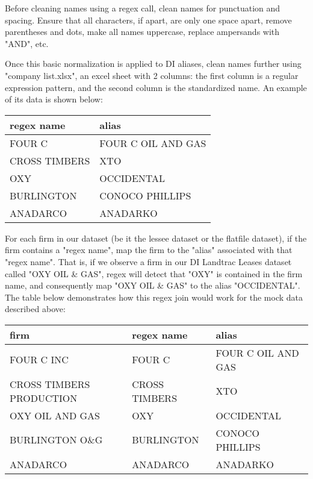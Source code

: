 \documentclass{article}
\begin{document}
Before cleaning names using a regex call, clean names for punctuation and spacing. Ensure that all characters, if apart, are only one space apart, remove parentheses and dots, make all names uppercase, replace ampersands with "AND", etc. 

Once this basic normalization is applied to DI aliases, clean names further using "company list.xlsx", an excel sheet with 2 columns: the first column is a regular expression pattern, and the second column is the standardized name. An example of its data is shown below:

\begin{center}
\begin{tabular}{| m{5cm} | m{5cm} |}
\hline
regex name & alias \\
\hline
FOUR C & FOUR C OIL AND GAS\\
CROSS TIMBERS & XTO\\
OXY & OCCIDENTAL\\
BURLINGTON & CONOCO PHILLIPS\\
ANADARCO & ANADARKO \\
\hline
\end{tabular}
\end{center}

For each firm in our dataset (be it the lessee dataset or the flatfile dataset), if the firm contains a "regex name", map the firm to the "alias" associated with that "regex name". That is, if we observe a firm in our DI Landtrac Leases dataset called "OXY OIL \& GAS", regex will detect that "OXY" is contained in the firm name, and consequently map "OXY OIL \& GAS" to the alias "OCCIDENTAL". The table below demonstrates how this regex join would work for the mock data described above:

\begin{center}
\begin{tabular}{| m{6cm} | m{4cm} | m{4cm} | }
\hline
firm & regex name & alias \\
\hline
FOUR C INC & FOUR C & FOUR C OIL AND GAS\\
CROSS TIMBERS PRODUCTION & CROSS TIMBERS & XTO\\
OXY OIL AND GAS & OXY & OCCIDENTAL\\
BURLINGTON O\&G & BURLINGTON & CONOCO PHILLIPS\\
ANADARCO & ANADARCO & ANADARKO \\
\hline
\end{tabular}
\end{center}
\end{document}
